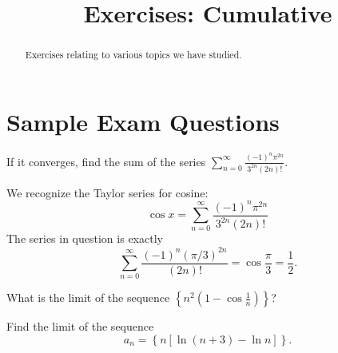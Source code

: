 \documentclass{ximera}
\title{Exercises: Cumulative}
\begin{document}
\begin{abstract}
Exercises relating to various topics we have studied.
\end{abstract}
\maketitle

\section*{Sample Exam Questions}

\begin{question}%

If it converges, find the sum of the series \(\displaystyle \sum_{n=0}^\infty \frac{(-1)^n \pi^{2n}}{3^{2n} (2n)!}\). 
\begin{multiplechoice}
\end{multiplechoice}
\begin{feedback}
We recognize the Taylor series for cosine:
\[ \cos x = \sum_{n=0}^\infty \frac{(-1)^n \pi^{2n}}{3^{2n}(2n)!} \]
The series in question is exactly
\[ \sum_{n=0}^\infty \frac{(-1)^n (\pi/3)^{2n}}{(2n)!} = \cos \frac{\pi}{3} = \frac{1}{2}. \]
\end{feedback}

\end{question}

\begin{question}%

What is the limit of the sequence \(\displaystyle \left\{ n^2 \left( 1 - \cos \frac{1}{n} \right) \right\}\)?
\begin{multiplechoice}
\end{multiplechoice}

\end{question}

\begin{question}%

Find the limit of the sequence
\[ a_n = \left\{ n \left[ \ln (n+3) - \ln n \right] \right\}. \]
\begin{multiplechoice}
\choice{\(\infty\)}
\end{multiplechoice}

\end{question}
\end{document}
